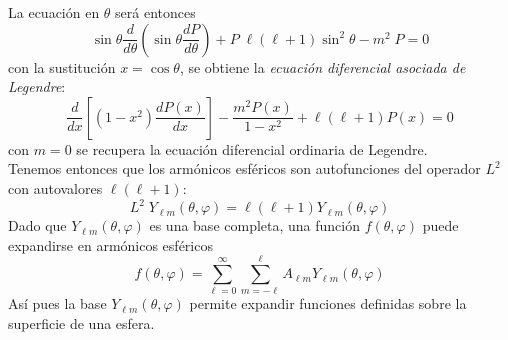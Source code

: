 La ecuación en $\theta$ será entonces
\[ \sin \theta \dfrac{d}{d \theta} \left( \sin \theta \dfrac{d P}{d \theta} \right) +  P \; \ell (\ell +  1) \sin^{2} \theta - m^{2} \; P = 0 \]
con la sustitución $x = \cos \theta$, se obtiene la \emph{ecuación diferencial asociada de Legendre}:
\[ \dfrac{d}{d x} \left[ (1 - x^{2}) \dfrac{d P(x)}{d x} \right] - \dfrac{m^{2} P(x)}{1 - x^{2}} + \ell (\ell + 1) P(x) = 0 \]
con $m = 0$ se recupera la ecuación diferencial ordinaria de Legendre.
\\
Tenemos entonces que los armónicos esféricos son autofunciones del operador $ L^{2}$ con autovalores $\ell (\ell + 1)$:
\[ L^{2} \; Y_{\ell m} (\theta, \varphi) = \ell (\ell + 1) Y_{\ell m} (\theta, \varphi) \]
Dado que ${Y_{\ell m} (\theta, \varphi)}$ es una base completa, una función $f(\theta, \varphi)$ puede expandirse en armónicos esféricos
\begin{equation}
f (\theta, \varphi) = \sum_{\ell = 0}^{\infty} \sum_{m = -\ell}^{\ell}  A_{\ell m} Y_{\ell m} (\theta, \varphi)
\label{eq:ecuacion_8_38}
\end{equation}
Así pues la base ${Y_{\ell m} (\theta, \varphi)}$ permite expandir funciones definidas sobre la superficie de una esfera.
